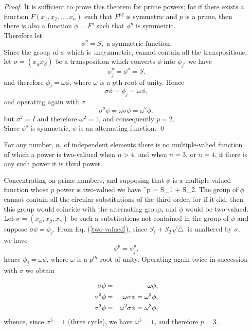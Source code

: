 \begin{proof}
It is sufficient to prove this theorem for prime powers; for if there exists a function $F(x_1, x_2, \hdots, x_n)$ such that $F^{pq}$ is symmetric and $p$ is a prime, then there is 
also a function $\phi = F^q$ such that $\phi^p$ is symmetric. \\

Therefore let \[ \phi^p = S, \mbox{    a symmetric function.}\] Since the group of $\phi$ which is unsymmetric, cannot contain all the transpositions, let $\sigma = (x_\alpha x_\beta)$ be a 
transposition which converts $\phi$ into $\phi_j$; we have \[ \phi_j^p = \phi^p = S.\] and therefore $\phi_j = \omega\phi$, where $\omega$ is a $p$th root of unity. Hence
\[ \sigma \phi = \phi_j = \omega \phi,\] and operating again with $\sigma$ 
\[ \sigma^2 \phi = \omega\sigma\phi = \omega^2 \phi,\] but $\sigma^2 = I$ and therefore $\omega^2 = 1$, and consequently $p=2$. \\

Since $\phi^s$ is symmetric, $\phi$ is an alternating function. \qed
\end{proof}

\begin{theorem}
For any number, $n$, of independent elements there is no multiple-valied function of which a power is two-valiued when $n>4$; and when $n=3$, or $n=4$, if there is any such power it is
third power.
\end{theorem}

Concentrating on prime numbers, and supposing that $\phi$ is a multiple-valued function whose $p$ power is two-valued we have
\be \phi^p = S_1 + S_2\sqrt{\triangle}. \label{two-valued}\ee
The group of $\phi$ cannot contain all the circular substitutions of the third order, for if it did, then this group would coincide with the alternating group, and $\phi$ would be two-valued. Let
$\sigma = (x_\alpha, x_\beta, x_\gamma)$ be such a substitutions not contained in the group of $\phi$ and suppose $\sigma\phi = \phi_j$. From Eq. (\ref{two-valued}),
since $S_1 + S_2\sqrt{\triangle}$ is unaltered by $\sigma$, we have
\[ \phi^p = \phi_j^p,\] hence $\phi_j = \omega \phi$, where $\omega$ is a $p^{th}$ root of unity. Operating again twice in succession with $\sigma$ we obtain

\begin{eqnarray*}
\sigma \phi &=& \omega \phi,\cr
\sigma^2 \phi &=& \omega\sigma\phi = \omega^2 \phi,\cr
\sigma^3 \phi &=& \omega^2 \sigma \phi = \omega^3 \phi,\cr
\end{eqnarray*}whence, since $\sigma^3 = 1$ (three cycle), we have $\omega^3 = 1$, and therefore $p=3$.\\

